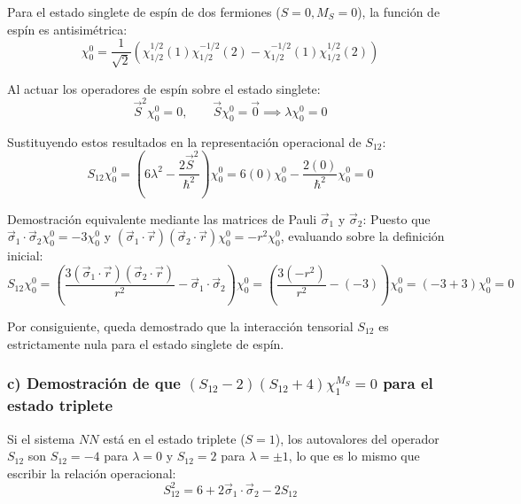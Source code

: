 \begin{problema}
Para el estado singlete de espín de dos fermiones ($S = 0, M_S = 0$), la función de espín es antisimétrica:
\begin{equation}
\chi_0^0 = \frac{1}{\sqrt{2}} \left( \chi_{1/2}^{1/2}(1) \chi_{1/2}^{-1/2}(2) - \chi_{1/2}^{-1/2}(1) \chi_{1/2}^{1/2}(2) \right)
\end{equation}

Al actuar los operadores de espín sobre el estado singlete:
\begin{equation}
\vec{S}^2 \chi_0^0 = 0, \qquad \vec{S} \chi_0^0 = \vec{0} \implies \lambda \chi_0^0 = 0
\end{equation}

Sustituyendo estos resultados en la representación operacional de $S_{12}$:
\begin{equation}
S_{12} \chi_0^0 = \left( 6 \lambda^2 - \frac{2\vec{S}^2}{\hbar^2} \right) \chi_0^0 = 6 (0) \chi_0^0 - \frac{2(0)}{\hbar^2} \chi_0^0 = 0
\end{equation}

Demostración equivalente mediante las matrices de Pauli $\vec{\sigma}_1$ y $\vec{\sigma}_2$:
Puesto que $\vec{\sigma}_1 \cdot \vec{\sigma}_2 \chi_0^0 = -3 \chi_0^0$ y $(\vec{\sigma}_1 \cdot \vec{r})(\vec{\sigma}_2 \cdot \vec{r}) \chi_0^0 = -r^2 \chi_0^0$, evaluando sobre la definición inicial:
\begin{equation}
S_{12} \chi_0^0 = \left( \frac{3(\vec{\sigma}_1 \cdot \vec{r})(\vec{\sigma}_2 \cdot \vec{r})}{r^2} - \vec{\sigma}_1 \cdot \vec{\sigma}_2 \right) \chi_0^0 = \left( \frac{3(-r^2)}{r^2} - (-3) \right) \chi_0^0 = (-3 + 3) \chi_0^0 = 0
\end{equation}

Por consiguiente, queda demostrado que la interacción tensorial $S_{12}$ es estrictamente nula para el estado singlete de espín.

\subsubsection*{c) Demostración de que $(S_{12} - 2)(S_{12} + 4)\chi_1^{M_S} = 0$ para el estado triplete}

Si el sistema $NN$ está en el estado triplete ($S=1$), los autovalores del operador $S_{12}$ son $S_{12} = -4$ para $\lambda = 0$ y $S_{12} = 2$ para $\lambda = \pm 1$, lo que es lo mismo que escribir la relación operacional:
\begin{equation}
S_{12}^2 = 6 + 2\vec{\sigma}_1 \cdot \vec{\sigma}_2 - 2S_{12}
\end{equation}


\end{problema}
